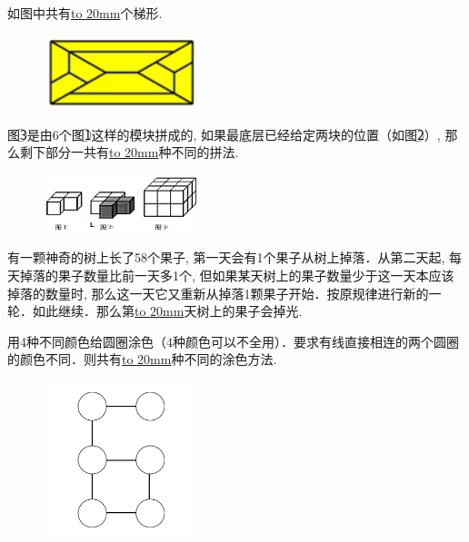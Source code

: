 \item {
    如图中共有\underline{\hbox to 20mm{}}个梯形.
    \begin{figure}[H] 
        \centering
        \includegraphics[width=0.4\textwidth]{./pics/Chapter_6/2016_1.png}
    \end{figure}
}

\item {
    图\textcircled{3}是由6个图\textcircled{1}这样的模块拼成的, 如果最底层已经给定两块的位置（如图\textcircled{2}）, 那么剩下部分一共有\underline{\hbox to 20mm{}}种不同的拼法.
    \begin{figure}[H] 
        \centering
        \includegraphics[width=0.4\textwidth]{./pics/Chapter_6/2016_2.png}
    \end{figure}
}

\item {
    有一颗神奇的树上长了58个果子, 第一天会有1个果子从树上掉落．从第二天起, 每天掉落的果子数量比前一天多1个, 但如果某天树上的果子数量少于这一天本应该掉落的数量时, 那么这一天它又重新从掉落1颗果子开始．按原规律进行新的一轮．如此继续．那么第\underline{\hbox to 20mm{}}天树上的果子会掉光.
}


\item {
    用4种不同颜色给圆圈涂色（4种颜色可以不全用）．要求有线直接相连的两个圆圈的颜色不同．则共有\underline{\hbox to 20mm{}}种不同的涂色方法.
    \begin{figure}[H] 
        \centering
        \includegraphics[width=0.4\textwidth]{./pics/Chapter_6/2016_3.png}
    \end{figure}
}

